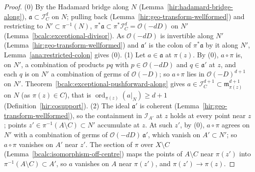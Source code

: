 \begin{proof}
\leanok
(0) By the Hadamard bridge along \(N\) (Lemma~\ref{hir:hadamard-bridge-along}), \(\mathfrak a\subset\mathcal I_C^d\) on \(N\); pulling back
(Lemma~\ref{hir:geo-transform-wellformed}) and restricting to \(N'\subset\pi^{-1}(N)\), \(\pi^*\mathfrak a\subset\pi^*\mathcal I_C^d=\mathcal O(-dD)\) on \(N'\)
(Lemma~\ref{bcalc:exceptional-divisor}). As \(\mathcal O(-dD)\) is invertible along \(N'\) (Lemma~\ref{hir:geo-transform-wellformed}) and \(\mathfrak a'\) is the colon of
\(\pi^*\mathfrak a\) by it along \(N'\), Lemma~\ref{ana:restricted-colon} gives (0).
(1) Let \(a\in\mathfrak a\) at \(\pi(z)\). By (0), \(a\circ\pi\) is, on \(N'\), a combination of products \(pq\) with \(p\in\mathcal O(-dD)\) and \(q\in\mathfrak a'\) at \(z\), and
each \(q\) is on \(N'\) a combination of germs of \(\mathcal O(-D)\); so \(a\circ\pi\) lies in \(\mathcal O(-D)^{d+1}\) on \(N'\). Theorem~\ref{bcalc:exceptional-pushforward-along}
gives \(a\in\mathcal I_C^{d+1}\subset\mathfrak m_{\pi(z)}^{d+1}\) on \(N\) (as \(\pi(z)\in C\)), that is \(\operatorname{ord}_{\pi(z)}(a|_N)\ge d+1\) (Definition~\ref{hir:cosupport}).
(2) The ideal \(\mathfrak a'\) is coherent (Lemma~\ref{hir:geo-transform-wellformed}), so the containment in \(\mathcal I_{A'}\) at \(z\) holds at every point near \(z\);
points \(z'\in\pi^{-1}(A\setminus C)\subset N'\) accumulate at \(z\). At such \(z'\), by (0), \(a\circ\pi\) agrees on \(N'\) with a combination of germs of
\(\mathcal O(-dD)\,\mathfrak a'\), which vanish on \(A'\subset N'\); so \(a\circ\pi\) vanishes on \(A'\) near \(z'\). The section of \(\pi\) over \(X\setminus C\)
(Lemma~\ref{bcalc:isomorphism-off-centre}) maps the points of \(A\setminus C\) near \(\pi(z')\) into \(\pi^{-1}(A\setminus C)\subset A'\), so \(a\) vanishes on \(A\) near
\(\pi(z')\), and \(\pi(z')\to\pi(z)\).
\end{proof}

